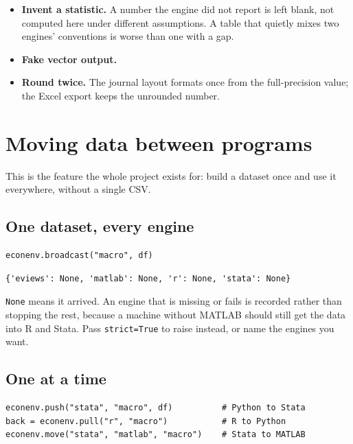 \documentclass[11pt,a4paper]{report}
\begin{document}
\begin{itemize}
  \item \textbf{Invent a statistic.} A number the engine did not report is left
        blank, not computed here under different assumptions. A table that
        quietly mixes two engines' conventions is worse than one with a gap.
  \item \textbf{Fake vector output.}
  \item \textbf{Round twice.} The journal layout formats once from the
        full-precision value; the Excel export keeps the unrounded number.
\end{itemize}

\chapter{Moving data between programs}

This is the feature the whole project exists for: build a dataset once and use
it everywhere, without a single CSV.

\section{One dataset, every engine}

\begin{lstlisting}
econenv.broadcast("macro", df)
\end{lstlisting}

\begin{lstlisting}
{'eviews': None, 'matlab': None, 'r': None, 'stata': None}
\end{lstlisting}

\texttt{None} means it arrived. An engine that is missing or fails is recorded
rather than stopping the rest, because a machine without MATLAB should still get
the data into R and Stata. Pass \texttt{strict=True} to raise instead, or name
the engines you want.

\section{One at a time}

\begin{lstlisting}
econenv.push("stata", "macro", df)          # Python to Stata
back = econenv.pull("r", "macro")           # R to Python
econenv.move("stata", "matlab", "macro")    # Stata to MATLAB
\end{lstlisting}
\end{document}

